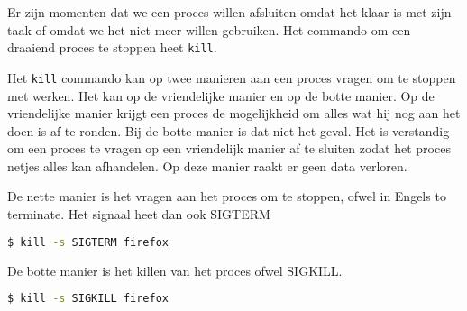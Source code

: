 Er zijn momenten dat we een proces willen afsluiten omdat het klaar is met zijn taak of omdat we het niet meer willen gebruiken. Het commando om een draaiend proces te stoppen heet \texttt{kill}.

Het \texttt{kill} commando kan op twee manieren aan een proces vragen om te stoppen met werken. Het kan op de vriendelijke manier en op de botte manier. Op de vriendelijke manier krijgt een proces de mogelijkheid om alles wat hij nog aan het doen is af te ronden. Bij de botte manier is dat niet het geval. Het is verstandig om een proces te vragen op een vriendelijk manier af te sluiten zodat het proces netjes alles kan afhandelen. Op deze manier raakt er geen data verloren.

De nette manier is het vragen aan het proces om te stoppen, ofwel in Engels to terminate. Het signaal heet dan ook SIGTERM
\begin{lstlisting}[language=bash]
$ kill -s SIGTERM firefox
\end{lstlisting}

De botte manier is het killen van het proces ofwel SIGKILL.
\begin{lstlisting}[language=bash]
$ kill -s SIGKILL firefox
\end{lstlisting}
